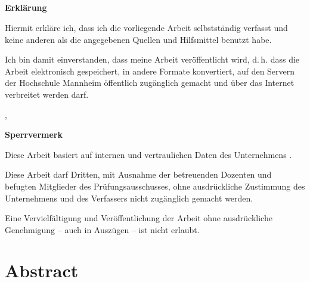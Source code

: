 %
  {\hsmabibde \\ \vspace{0.5cm} \\ \hsmabiben}
  {\hsmabiben \\ \vspace{0.5cm} \\ \hsmabibde}


\clearpage\setcounter{page}{1}
\thispagestyle{empty}
\textsf{\large\textbf{Erklärung}}

Hiermit erkläre ich, dass ich die vorliegende Arbeit selbstständig verfasst und keine anderen als die angegebenen Quellen und Hilfsmittel benutzt habe.

%
{
\vspace{0.5cm}
Ich bin damit einverstanden, dass meine Arbeit veröffentlicht wird, d.\,h. dass die Arbeit elektronisch gespeichert, in andere Formate konvertiert, auf den Servern der Hochschule Mannheim öffentlich zugänglich gemacht und über das Internet verbreitet werden darf. 
}{}%


\vspace{1cm}
\hsmaort, \hsmadatum \\

\vspace{1.2cm}						                                      
\hsmaautor

%
{%
\vspace{11cm}
\color{red}\textsf{\large\textbf{Sperrvermerk}}

Diese Arbeit basiert auf internen und vertraulichen Daten des Unternehmens \hsmafirma.

Diese Arbeit darf Dritten, mit Ausnahme der betreuenden Dozenten und befugten Mitglieder des Prüfungsausschusses, ohne ausdrückliche Zustimmung des Unternehmens und des Verfassers nicht zugänglich gemacht werden.

Eine Vervielfältigung und Veröffentlichung der Arbeit ohne ausdrückliche Genehmigung -- auch in Auszügen -- ist nicht erlaubt.
}{}

\cleardoublepage

\chapter*{Abstract}

%
  {\subsubsection*{\hsmatitelde}\hsmaabstractde\subsubsection*{\hsmatitelen}\hsmaabstracten}
  {\subsubsection*{\hsmatitelen}\hsmaabstracten\subsubsection*{\hsmatitelde}\hsmaabstractde}
